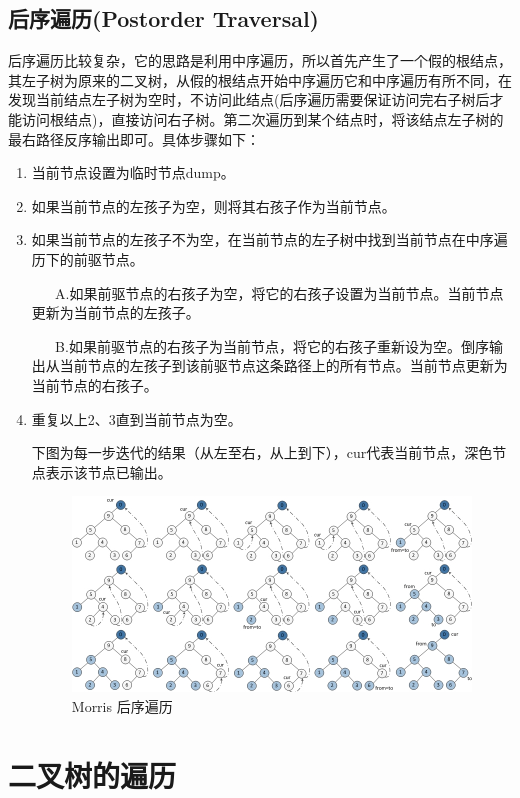 \documentclass[12pt]{book}
\begin{document}
\subsection{后序遍历(Postorder Traversal)}
\label{sec-4-1-3}

后序遍历比较复杂，它的思路是利用中序遍历，所以首先产生了一个假的根结点，其左子树为原来的二叉树，从假的根结点开始中序遍历它和中序遍历有所不同，在发现当前结点左子树为空时，不访问此结点(后序遍历需要保证访问完右子树后才能访问根结点)，直接访问右子树。第二次遍历到某个结点时，将该结点左子树的最右路径反序输出即可。具体步骤如下：

\begin{enumerate}
\item 当前节点设置为临时节点dump。
\label{sec-4-1-3-1}
\item 如果当前节点的左孩子为空，则将其右孩子作为当前节点。
\label{sec-4-1-3-2}
\item 如果当前节点的左孩子不为空，在当前节点的左子树中找到当前节点在中序遍历下的前驱节点。
\label{sec-4-1-3-3}

~ ~ A.如果前驱节点的右孩子为空，将它的右孩子设置为当前节点。当前节点更新为当前节点的左孩子。

~ ~ B.如果前驱节点的右孩子为当前节点，将它的右孩子重新设为空。倒序输出从当前节点的左孩子到该前驱节点这条路径上的所有节点。当前节点更新为当前节点的右孩子。

\item 重复以上2、3直到当前节点为空。
\label{sec-4-1-3-4}

下图为每一步迭代的结果（从左至右，从上到下），cur代表当前节点，深色节点表示该节点已输出。

\begin{figure}[htb]
\centering
\includegraphics[width=.9\linewidth]{./pic/morrPost.jpg}
\caption{Morris 后序遍历}
\end{figure}
\end{enumerate}

\section{二叉树的遍历}
\label{sec-4-2}
\end{document}
